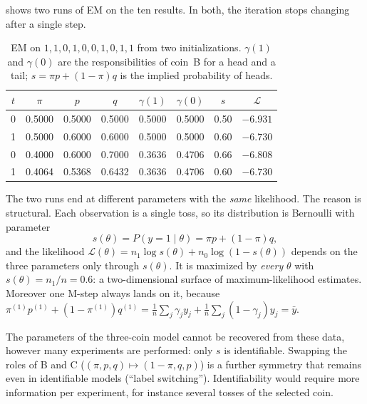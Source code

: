 \begin{notechapter}
 shows two runs of EM on the ten results. In both, the
iteration stops changing after a single step.

\begin{table}[ht]
\centering
\caption{EM on $1,1,0,1,0,0,1,0,1,1$ from two initializations. $\gamma(1)$ and
$\gamma(0)$ are the responsibilities of coin~B for a head and a tail;
$s = \pi p + (1-\pi)q$ is the implied probability of heads.}
\label{em-algorithm:tab:run}
\begin{tabular}{@{}cccccccc@{}}
\toprule
$t$ & $\pi$ & $p$ & $q$ & $\gamma(1)$ & $\gamma(0)$ & $s$ & $\mathcal L$ \\
\midrule
0 & 0.5000 & 0.5000 & 0.5000 & 0.5000 & 0.5000 & 0.50 & $-6.931$ \\
1 & 0.5000 & 0.6000 & 0.6000 & 0.5000 & 0.5000 & 0.60 & $-6.730$ \\
\midrule
0 & 0.4000 & 0.6000 & 0.7000 & 0.3636 & 0.4706 & 0.66 & $-6.808$ \\
1 & 0.4064 & 0.5368 & 0.6432 & 0.3636 & 0.4706 & 0.60 & $-6.730$ \\
\bottomrule
\end{tabular}
\end{table}

The two runs end at different parameters with the \emph{same} likelihood. The
reason is structural. Each observation is a single toss, so its distribution is
Bernoulli with parameter
\[
  s(\theta) = P(y = 1\mid\theta) = \pi p + (1-\pi)q,
\]
and the likelihood $\mathcal L(\theta) = n_1\log s(\theta) + n_0\log(1 - s(\theta))$
depends on the three parameters only through $s(\theta)$. It is maximized by
\emph{every} $\theta$ with $s(\theta) = n_1/n = 0.6$: a two-dimensional surface of
maximum-likelihood estimates. Moreover one M-step always lands on it, because
$\pi^{(1)}p^{(1)} + (1-\pi^{(1)})q^{(1)} = \frac1n\sum_j\gamma_jy_j + \frac1n\sum_j(1-\gamma_j)y_j = \bar y$.

\begin{pitfall}
The parameters of the three-coin model cannot be recovered from these data,
however many experiments are performed: only $s$ is identifiable. Swapping the
roles of B and C ($(\pi,p,q)\mapsto(1-\pi,q,p)$) is a further symmetry that remains
even in identifiable models (``label switching''). Identifiability would require
more information per experiment, for instance several tosses of the selected
coin.
\end{pitfall}


\end{notechapter}
